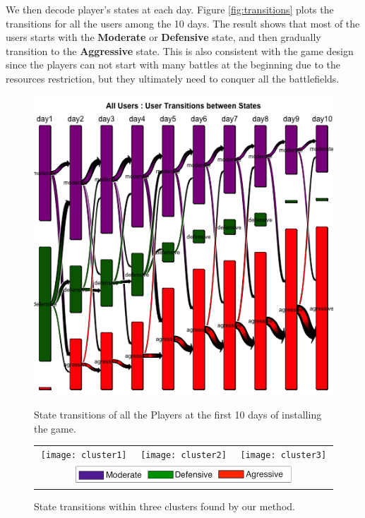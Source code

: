 We then decode player's  states at each day.
Figure \ref{fig:transitions} plots the transitions for all the users among the 10 days. 
The result shows that most of the users starts with the \textbf{Moderate} or \textbf{Defensive} state, 
and then gradually transition to the \textbf{Aggressive} state. 
This is also consistent with the game design since the players can not start with many battles at
the beginning due to the resources restriction, but they ultimately need to 
conquer all the battlefields.

\begin{figure}[h]
\begin{minipage}[b]{0.3\linewidth}
    \centering
    \includegraphics[width=0.8\linewidth]{transitions} 
    \caption{State transitions of all the Players at the first 10 days of installing the game.}
    \label{fig:transitions}
\end{minipage}
\quad
\begin{minipage}[b]{0.65\linewidth}
    \centering
        \begin{tabular}{ccc}
         \texttt{[image: cluster1]} &
         \texttt{[image: cluster2]} &
         \texttt{[image: cluster3]} \\
         \multicolumn{3}{c}{ \includegraphics[width=0.75\textwidth]{legend} }
         \end{tabular}
     \caption{\label{fig:clusters} State transitions within three clusters found by our method.}
\end{minipage}
\end{figure}

